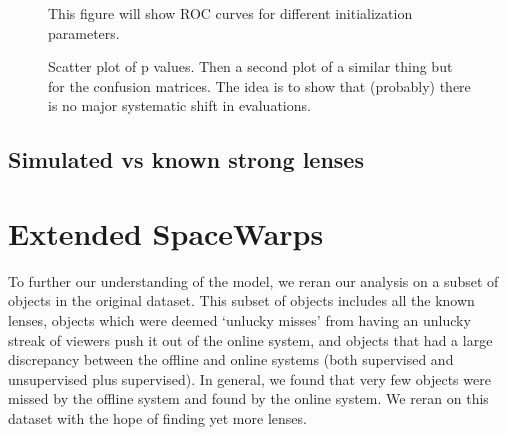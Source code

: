 \documentclass[useAMS,usenatbib,a4paper]{mn2e}
\begin{document}
\begin{figure}
\begin{center}
\end{center}
\caption{This figure will show ROC curves for different initialization parameters.}
\label{fig:init:roc}
\end{figure}

\begin{figure}
\begin{center}
\end{center}
\caption{Scatter plot of p values. Then a second plot of a similar thing but for
the confusion matrices. The idea is to show that (probably) there is no major
systematic shift in evaluations.}
\label{fig:init:scatter}
\end{figure}

\subsection{Simulated vs known strong lenses}



\section{Extended SpaceWarps}


To further our understanding of the \SW model, we reran our analysis on a
subset of objects in the original dataset. This subset of objects includes all
the known lenses, objects which were deemed `unlucky misses' from having an
unlucky streak of viewers push it out of the online system, and objects that
had a large discrepancy between the offline and online systems (both supervised
and unsupervised plus supervised). In general, we found that very few objects
were missed by the offline system and found by the online system. We reran on
this dataset with the hope of finding yet more lenses. %
\end{document}

